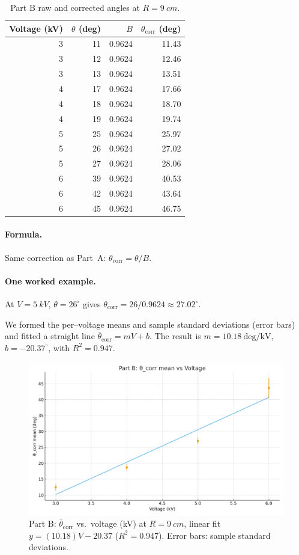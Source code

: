 \documentclass[12pt]{article}
\begin{document}
\begin{table}[H]
\centering
\caption{Part B raw and corrected angles at $R=\SI{9}{cm}$.}
\begin{tabular}{@{}rrrr@{}}
\toprule
Voltage (kV) & $\theta$ (deg) & $B$ & $\theta_{\mathrm{corr}}$ (deg)\\
\midrule
3 & 11 & 0.9624 & 11.43 \\
3 & 12 & 0.9624 & 12.46 \\
3 & 13 & 0.9624 & 13.51 \\
4 & 17 & 0.9624 & 17.66 \\
4 & 18 & 0.9624 & 18.70 \\
4 & 19 & 0.9624 & 19.74 \\
5 & 25 & 0.9624 & 25.97 \\
5 & 26 & 0.9624 & 27.02 \\
5 & 27 & 0.9624 & 28.06 \\
6 & 39 & 0.9624 & 40.53 \\
6 & 42 & 0.9624 & 43.64 \\
6 & 45 & 0.9624 & 46.75 \\
\bottomrule
\end{tabular}
\end{table}

\paragraph{Formula.}
Same correction as Part~A: $\theta_{\mathrm{corr}}=\theta/B$.

\paragraph{One worked example.}
At $V=\SI{5}{kV}$, $\theta=26^\circ$ gives $\theta_{\mathrm{corr}}=26/0.9624\approx 27.02^\circ$.

We formed the per–voltage means and sample standard deviations (error bars) and fitted a straight line $\bar\theta_{\mathrm{corr}}=mV+b$. The result is $m=10.18\ \mathrm{deg/kV}$, $b=-20.37^\circ$, with $R^2=0.947$.

\begin{figure}[H]
  \centering
  \includegraphics[width=0.72\linewidth]{partB_voltage.pdf}
  \caption{Part B: $\bar\theta_{\mathrm{corr}}$ vs.\ voltage (kV) at $R=\SI{9}{cm}$, linear fit $y=(10.18)V-20.37$ ($R^2=0.947$). Error bars: sample standard deviations.}
\end{figure}
\end{document}
